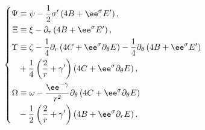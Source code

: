 \begin{equation}
\left\{
\begin{aligned}
 \Psi & \equiv \psi - \displaystyle {1\over2} \sigma'
    \left(4B + \ee^\sigma E' \right),\\
 \Xi & \equiv \xi
    -\partial_r\left(4B + \ee^\sigma E' \right),\\
 \Upsilon
    & \equiv\zeta - \displaystyle {1\over 4} \partial_r \left(4C +
    \ee^{\sigma} \partial_\theta E\right) -\displaystyle {1\over 4}
    \partial_\theta \left(4B + \ee^{\sigma} E'\right) \\
&  + \displaystyle{1\over4} \left({2\over r} + \gamma'\right) \left(4C
    + \ee^{\sigma} \partial_\theta E \right),\\
 \Omega & \equiv \omega - \displaystyle {\ee^{-\gamma} \over r^2}
    \partial_\theta \left(4C + \ee^\sigma \partial_\theta E \right) \\
 &     - \displaystyle {1\over2} \left({2 \over r} +
    \gamma' \right) \left(4B + \ee^\sigma \partial_r E
    \right).
\end{aligned}
\right.
\end{equation}

